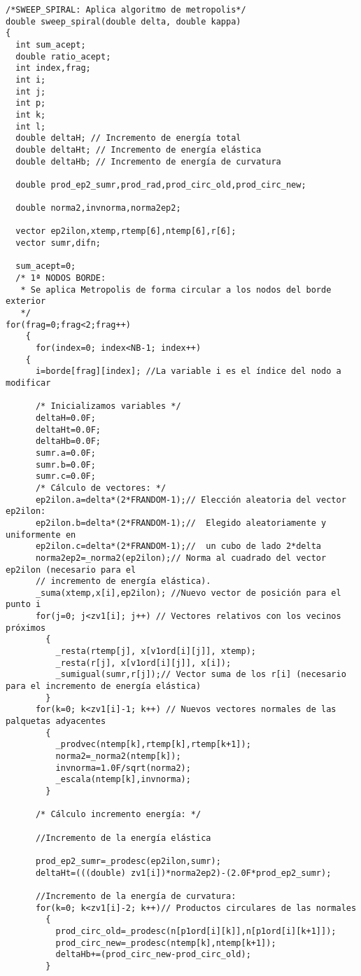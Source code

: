 \begin{verbatim}
/*SWEEP_SPIRAL: Aplica algoritmo de metropolis*/
double sweep_spiral(double delta, double kappa)
{
  int sum_acept;
  double ratio_acept;
  int index,frag;
  int i;
  int j;
  int p;
  int k;
  int l;
  double deltaH; // Incremento de energía total
  double deltaHt; // Incremento de energía elástica
  double deltaHb; // Incremento de energía de curvatura

  double prod_ep2_sumr,prod_rad,prod_circ_old,prod_circ_new;

  double norma2,invnorma,norma2ep2;

  vector ep2ilon,xtemp,rtemp[6],ntemp[6],r[6];
  vector sumr,difn;

  sum_acept=0;
  /* 1ª NODOS BORDE:
   * Se aplica Metropolis de forma circular a los nodos del borde exterior
   */
for(frag=0;frag<2;frag++)
    {
      for(index=0; index<NB-1; index++)
	{
	  i=borde[frag][index]; //La variable i es el índice del nodo a modificar

	  /* Inicializamos variables */
	  deltaH=0.0F;
	  deltaHt=0.0F;
	  deltaHb=0.0F;
	  sumr.a=0.0F;
	  sumr.b=0.0F;
	  sumr.c=0.0F;	  
	  /* Cálculo de vectores: */      
	  ep2ilon.a=delta*(2*FRANDOM-1);// Elección aleatoria del vector ep2ilon:
	  ep2ilon.b=delta*(2*FRANDOM-1);//  Elegido aleatoriamente y uniformente en   
	  ep2ilon.c=delta*(2*FRANDOM-1);//  un cubo de lado 2*delta
	  norma2ep2=_norma2(ep2ilon);// Norma al cuadrado del vector ep2ilon (necesario para el 
	  // incremento de energía elástica).
	  _suma(xtemp,x[i],ep2ilon); //Nuevo vector de posición para el punto i
	  for(j=0; j<zv1[i]; j++) // Vectores relativos con los vecinos próximos
	    {
	      _resta(rtemp[j], x[v1ord[i][j]], xtemp);
	      _resta(r[j], x[v1ord[i][j]], x[i]); 
	      _sumigual(sumr,r[j]);// Vector suma de los r[i] (necesario para el incremento de energía elástica)
	    }
	  for(k=0; k<zv1[i]-1; k++) // Nuevos vectores normales de las palquetas adyacentes
	    {
	      _prodvec(ntemp[k],rtemp[k],rtemp[k+1]);
	      norma2=_norma2(ntemp[k]);
	      invnorma=1.0F/sqrt(norma2);
	      _escala(ntemp[k],invnorma);
	    }
	  
	  /* Cálculo incremento energía: */
	  
	  //Incremento de la energía elástica
	  
	  prod_ep2_sumr=_prodesc(ep2ilon,sumr);
	  deltaHt=(((double) zv1[i])*norma2ep2)-(2.0F*prod_ep2_sumr);
	  
	  //Incremento de la energía de curvatura:
	  for(k=0; k<zv1[i]-2; k++)// Productos circulares de las normales
	    {
	      prod_circ_old=_prodesc(n[p1ord[i][k]],n[p1ord[i][k+1]]);
	      prod_circ_new=_prodesc(ntemp[k],ntemp[k+1]);
	      deltaHb+=(prod_circ_new-prod_circ_old);
	    }


\end{verbatim}

